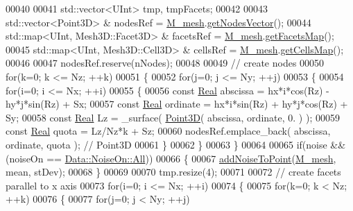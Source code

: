 \begin{DoxyCode}
00040 
00041     std::vector<UInt> tmp, tmpFacets;
00042 
00043     std::vector<Point3D> & nodesRef = \hyperlink{classFVCode3D_1_1CartesianGrid_a40c64e663b3d2de02b852403c75495fb}{M\_mesh}.\hyperlink{classFVCode3D_1_1Mesh3D_a04162ec60e0fe52674b3ecbb7de1185c}{getNodesVector}();
00044     std::map<UInt, Mesh3D::Facet3D> & facetsRef = \hyperlink{classFVCode3D_1_1CartesianGrid_a40c64e663b3d2de02b852403c75495fb}{M\_mesh}.\hyperlink{classFVCode3D_1_1Mesh3D_a76de387da2a552e3e1210d795bc7acf9}{getFacetsMap}();
00045     std::map<UInt, Mesh3D::Cell3D> & cellsRef = \hyperlink{classFVCode3D_1_1CartesianGrid_a40c64e663b3d2de02b852403c75495fb}{M\_mesh}.\hyperlink{classFVCode3D_1_1Mesh3D_ad904ef5e068c89951d77e9364e960bf3}{getCellsMap}();
00046 
00047     nodesRef.reserve(nNodes);
00048 
00049     \textcolor{comment}{// create nodes}
00050     \textcolor{keywordflow}{for}(k=0; k <= Nz; ++k)
00051     \{
00052         \textcolor{keywordflow}{for}(j=0; j <= Ny; ++j)
00053         \{
00054             \textcolor{keywordflow}{for}(i=0; i <= Nx; ++i)
00055             \{
00056                 \textcolor{keyword}{const} \hyperlink{namespaceFVCode3D_a40c1f5588a248569d80aa5f867080e83}{Real} abscissa = hx*i*cos(Rz) - hy*j*sin(Rz) + Sx;
00057                 \textcolor{keyword}{const} \hyperlink{namespaceFVCode3D_a40c1f5588a248569d80aa5f867080e83}{Real} ordinate = hx*i*sin(Rz) + hy*j*cos(Rz) + Sy;
00058                 \textcolor{keyword}{const} \hyperlink{namespaceFVCode3D_a40c1f5588a248569d80aa5f867080e83}{Real} Lz = \_surface( \hyperlink{classFVCode3D_1_1Point3D}{Point3D}( abscissa, ordinate, 0. ) );
00059                 \textcolor{keyword}{const} \hyperlink{namespaceFVCode3D_a40c1f5588a248569d80aa5f867080e83}{Real} quota = Lz/Nz*k + Sz;
00060                 nodesRef.emplace\_back( abscissa, ordinate, quota ); \textcolor{comment}{// Point3D}
00061             \}
00062         \}
00063     \}
00064 
00065     \textcolor{keywordflow}{if}(noise && (noiseOn == \hyperlink{classFVCode3D_1_1Data_a983fdc14aa355a7c9fd614b9655a3552ab1c94ca2fbc3e78fc30069c8d0f01680}{Data::NoiseOn::All}))
00066     \{
00067         \hyperlink{namespaceFVCode3D_a9f604a7093f7f7323727e7ba28d8ce75}{addNoiseToPoint}(\hyperlink{classFVCode3D_1_1CartesianGrid_a40c64e663b3d2de02b852403c75495fb}{M\_mesh}, mean, stDev);
00068     \}
00069 
00070     tmp.resize(4);
00071 
00072     \textcolor{comment}{// create facets parallel to x axis}
00073     \textcolor{keywordflow}{for}(i=0; i <= Nx; ++i)
00074     \{
00075         \textcolor{keywordflow}{for}(k=0; k < Nz; ++k)
00076         \{
00077             \textcolor{keywordflow}{for}(j=0; j < Ny; ++j)

\end{DoxyCode}
